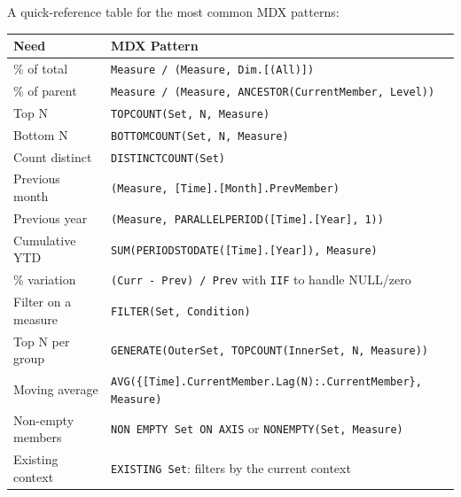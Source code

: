 A quick-reference table for the most common MDX patterns:
{\scriptsize
\begin{center}
\begin{tabular}{@{}l>{\raggedright\arraybackslash}p{6.2cm}@{}}
\toprule
\textbf{Need} & \textbf{MDX Pattern} \\
\midrule
\% of total & \texttt{Measure / (Measure, Dim.[(All)])} \\
\% of parent & \texttt{Measure / (Measure, ANCESTOR(CurrentMember, Level))} \\
Top N & \texttt{TOPCOUNT(Set, N, Measure)} \\
Bottom N & \texttt{BOTTOMCOUNT(Set, N, Measure)} \\
Count distinct & \texttt{DISTINCTCOUNT(Set)} \\
Previous month & \texttt{(Measure, [Time].[Month].PrevMember)} \\
Previous year  & \texttt{(Measure, PARALLELPERIOD([Time].[Year], 1))} \\
Cumulative YTD & \texttt{SUM(PERIODSTODATE([Time].[Year]), Measure)} \\
\% variation & \texttt{(Curr - Prev) / Prev} with \texttt{IIF} to handle NULL/zero \\
Filter on a measure & \texttt{FILTER(Set, Condition)} \\
Top N per group & \texttt{GENERATE(OuterSet, TOPCOUNT(InnerSet, N, Measure))} \\
Moving average & \texttt{AVG(\{[Time].CurrentMember.Lag(N):\allowbreak[Time].CurrentMember\},\allowbreak{} Measure)} \\
Non-empty members & \texttt{NON EMPTY Set ON AXIS} or \texttt{NONEMPTY(Set, Measure)} \\
Existing context & \texttt{EXISTING Set}: filters by the current context \\
\bottomrule
\end{tabular}
\end{center}
}
